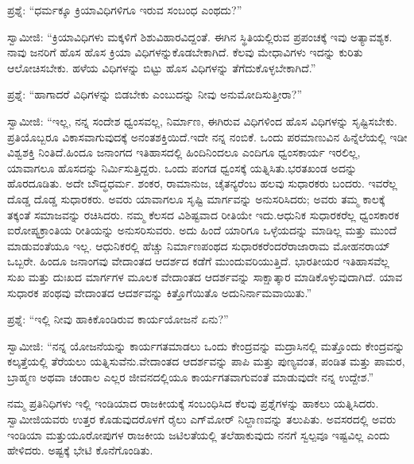 \vskip 0.1cm

ಪ್ರಶ್ನೆ: “ಧರ್ಮಕ್ಕೂ ಕ್ರಿಯಾವಿಧಿಗಳಿಗೂ ಇರುವ ಸಂಬಂಧ ಎಂಥದು?”

\vskip 0.1cm

ಸ್ವಾಮೀಜಿ: “ಕ್ರಿಯಾವಿಧಿಗಳು ಮಕ್ಕಳಿಗೆ ಶಿಶುವಿಹಾರವಿದ್ದಂತೆ. ಈಗಿನ ಸ್ಥಿತಿಯಲ್ಲಿರುವ ಪ್ರಪಂಚಕ್ಕೆ ಇವು ಅತ್ಯಾವಶ್ಯಕ. ನಾವು ಜನರಿಗೆ ಹೊಸ ಹೊಸ ಕ್ರಿಯಾ ವಿಧಿಗಳನ್ನು\break ಕೊಡಬೇಕಾಗಿದೆ. ಕೆಲವು ಮೇಧಾವಿಗಳು ಇದನ್ನು ಕುರಿತು ಆಲೋಚಿಸಬೇಕು. ಹಳೆಯ ವಿಧಿಗಳನ್ನು ಬಿಟ್ಟು ಹೊಸ ವಿಧಿಗಳನ್ನು ತೆಗೆದುಕೊಳ್ಳಬೇಕಾಗಿದೆ.”

\vskip 0.1cm

ಪ್ರಶ್ನೆ: “ಹಾಗಾದರೆ ವಿಧಿಗಳನ್ನು ಬಿಡಬೇಕು ಎಂಬುದನ್ನು ನೀವು ಅನುಮೋದಿಸು\-ತ್ತೀರಾ?”

\vskip 0.1cm

ಸ್ವಾಮೀಜಿ: “ಇಲ್ಲ, ನನ್ನ ಸಂದೇಶ ಧ್ವಂಸವಲ್ಲ, ನಿರ್ಮಾಣ, ಈಗಿರುವ ವಿಧಿಗಳಿಂದ ಹೊಸ ವಿಧಿಗಳನ್ನು ಸೃಷ್ಟಿಸಬೇಕು. ಪ್ರತಿಯೊಬ್ಬರೂ ವಿಕಾಸವಾಗುವುದಕ್ಕೆ ಅನಂತಶಕ್ತಿಯಿದೆ.\break ಇದೇ ನನ್ನ ನಂಬಿಕೆ. ಒಂದು ಪರಮಾಣುವಿನ ಹಿನ್ನೆಲೆಯಲ್ಲಿ ಇಡೀ ವಿಶ್ವಶಕ್ತಿ ನಿಂತಿದೆ.\break ಹಿಂದೂ ಜನಾಂಗದ ಇತಿಹಾಸದಲ್ಲಿ ಹಿಂದಿನಿಂದಲೂ ಎಂದಿಗೂ ಧ್ವಂಸಕಾರ್ಯ ಇರಲಿಲ್ಲ, ಯಾವಾಗಲೂ ಹೊಸದನ್ನು ನಿರ್ಮಿಸುತ್ತಿದ್ದರು. ಒಂದು ಪಂಗಡ ಧ್ವಂಸಕ್ಕೆ ಯತ್ನಿಸಿತು.\break ಭರತಖಂಡ ಅದನ್ನು ಹೊರದೂಡಿತು. ಅದೇ ಬೌದ್ಧಧರ್ಮ. ಶಂಕರ, ರಾಮಾನುಜ, ಚೈತನ್ಯರೆಂಬ ಹಲವು ಸುಧಾರಕರು ಬಂದರು. ಇವರೆಲ್ಲ ದೊಡ್ಡ ದೊಡ್ಡ ಸುಧಾರಕರು. ಅವರು ಯಾವಾಗಲೂ ಸೃಷ್ಟಿ ಮಾರ್ಗವನ್ನು ಅನುಸರಿಸಿದರು; ಅವರು ತಮ್ಮ ಕಾಲಕ್ಕೆ ತಕ್ಕಂತೆ ಸಮಾಜವನ್ನು ರಚಿಸಿದರು. ನಮ್ಮ ಕೆಲಸದ ವಿಶಿಷ್ಟವಾದ ರೀತಿಯೇ ಇದು.\break ಆಧುನಿಕ ಸುಧಾರಕರೆಲ್ಲ ಧ್ವಂಸಕಾರಕ ಐರೋಪ್ಯಕ್ರಾಂತಿಯ ರೀತಿಯನ್ನು ಅನುಸರಿಸುವರು. ಅದು ಹಿಂದೆ ಯಾರಿಗೂ ಒಳ್ಳೆಯದನ್ನು ಮಾಡಿಲ್ಲ ಮತ್ತು ಮುಂದೆ ಮಾಡುವಂತೆಯೂ ಇಲ್ಲ. ಆಧುನಿಕರಲ್ಲಿ ಹೆಚ್ಚು ನಿರ್ಮಾಣಪಂಥದ ಸುಧಾರಕರೆಂದರೆ\break ರಾಜಾರಾಮ ಮೋಹನರಾಯ್​ ಒಬ್ಬರೇ. ಹಿಂದೂ ಜನಾಂಗವು ವೇದಾಂತದ ಆದರ್ಶದ ಕಡೆಗೆ ಮುಂದುವರಿಯುತ್ತಿದೆ. ಭಾರತೀಯರ ಇತಿಹಾಸವೆಲ್ಲ ಸುಖ ಮತ್ತು ದುಃಖದ ಮಾರ್ಗಗಳ ಮೂಲಕ ವೇದಾಂತದ ಆದರ್ಶವನ್ನು ಸಾಕ್ಷಾತ್ಕಾರ ಮಾಡಿಕೊಳ್ಳುವುದಾಗಿದೆ. ಯಾವ ಸುಧಾರಕ ಪಂಥವು ವೇದಾಂತದ ಆದರ್ಶವನ್ನು ಕಿತ್ತೊಗೆಯಿತೊ ಅದು\break ನಿರ್ನಾಮವಾಯಿತು.”

\vskip 0.1cm

ಪ್ರಶ್ನೆ: “ಇಲ್ಲಿ ನೀವು ಹಾಕಿಕೊಂಡಿರುವ ಕಾರ್ಯಯೋಜನೆ ಏನು?”

\vskip 0.1cm

ಸ್ವಾಮೀಜಿ: “ನನ್ನ ಯೋಜನೆಯನ್ನು ಕಾರ್ಯಗತಮಾಡಲು ಒಂದು ಕೇಂದ್ರವನ್ನು ಮದ್ರಾಸಿನಲ್ಲಿ ಮತ್ತೊಂದು ಕೇಂದ್ರವನ್ನು ಕಲ್ಕತ್ತೆಯಲ್ಲಿ ತೆರೆಯಲು ಯತ್ನಿಸುವೆನು.\break ವೇದಾಂತದ ಆದರ್ಶವನ್ನು ಪಾಪಿ ಮತ್ತು ಪುಣ್ಯವಂತ, ಪಂಡಿತ ಮತ್ತು ಪಾಮರ, ಬ್ರಾಹ್ಮಣ ಅಥವಾ ಚಂಡಾಲ ಎಲ್ಲರ ಜೀವನದಲ್ಲಿಯೂ ಕಾರ್ಯಗತವಾಗುವಂತೆ ಮಾಡುವುದೇ ನನ್ನ ಉದ್ದೇಶ.”

ನಮ್ಮ ಪ್ರತಿನಿಧಿಗಳು ಇಲ್ಲಿ ಇಂಡಿಯಾದ ರಾಜಕೀಯಕ್ಕೆ ಸಂಬಂಧಿಸಿದ ಕೆಲವು ಪ್ರಶ್ನೆಗಳನ್ನು ಹಾಕಲು ಯತ್ನಿಸಿದರು. ಸ್ವಾಮೀಜಿಯವರು ಉತ್ತರ ಕೊಡುವುದರೊಳಗೆ ರೈಲು ಎಗ್​ಮೋರ್​ ನಿಲ್ದಾಣವನ್ನು ತಲುಪಿತು. ಅವಸರದಲ್ಲಿ ಅವರು ಇಂಡಿಯಾ ಮತ್ತು\break ಯೂರೋಪುಗಳ ರಾಜಕೀಯ ಜಟಿಲತೆಯಲ್ಲಿ ತಲೆಹಾಕುವುದು ನನಗೆ ಸ್ವಲ್ಪವೂ ಇಷ್ಟವಿಲ್ಲ ಎಂದು ಹೇಳಿದರು. ಅಷ್ಟಕ್ಕೆ ಭೇಟಿ ಕೊನೆಗೊಂಡಿತು.

